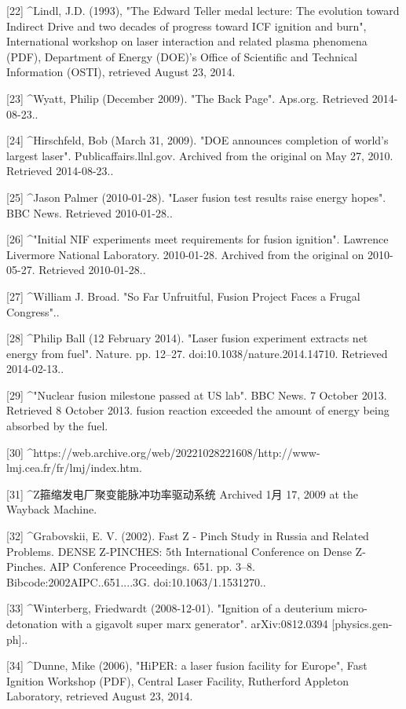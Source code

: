 [22]
^Lindl, J.D. (1993), "The Edward Teller medal lecture: The evolution toward Indirect Drive and two decades of progress toward ICF ignition and burn", International workshop on laser interaction and related plasma phenomena (PDF), Department of Energy (DOE)'s Office of Scientific and Technical Information (OSTI), retrieved August 23, 2014.

[23]
^Wyatt, Philip (December 2009). "The Back Page". Aps.org. Retrieved 2014-08-23..

[24]
^Hirschfeld, Bob (March 31, 2009). "DOE announces completion of world's largest laser". Publicaffairs.llnl.gov. Archived from the original on May 27, 2010. Retrieved 2014-08-23..

[25]
^Jason Palmer (2010-01-28). "Laser fusion test results raise energy hopes". BBC News. Retrieved 2010-01-28..

[26]
^"Initial NIF experiments meet requirements for fusion ignition". Lawrence Livermore National Laboratory. 2010-01-28. Archived from the original on 2010-05-27. Retrieved 2010-01-28..

[27]
^William J. Broad. "So Far Unfruitful, Fusion Project Faces a Frugal Congress"..

[28]
^Philip Ball (12 February 2014). "Laser fusion experiment extracts net energy from fuel". Nature. pp. 12–27. doi:10.1038/nature.2014.14710. Retrieved 2014-02-13..

[29]
^"Nuclear fusion milestone passed at US lab". BBC News. 7 October 2013. Retrieved 8 October 2013. fusion reaction exceeded the amount of energy being absorbed by the fuel.

[30]
^https://web.archive.org/web/20221028221608/http://www-lmj.cea.fr/fr/lmj/index.htm.

[31]
^Z箍缩发电厂聚变能脉冲功率驱动系统 Archived 1月 17, 2009 at the Wayback Machine.

[32]
^Grabovskii, E. V. (2002). Fast Z - Pinch Study in Russia and Related Problems. DENSE Z-PINCHES: 5th International Conference on Dense Z-Pinches. AIP Conference Proceedings. 651. pp. 3–8. Bibcode:2002AIPC..651....3G. doi:10.1063/1.1531270..

[33]
^Winterberg, Friedwardt (2008-12-01). "Ignition of a deuterium micro-detonation with a gigavolt super marx generator". arXiv:0812.0394 [physics.gen-ph]..

[34]
^Dunne, Mike (2006), "HiPER: a laser fusion facility for Europe", Fast Ignition Workshop (PDF), Central Laser Facility, Rutherford Appleton Laboratory, retrieved August 23, 2014.

